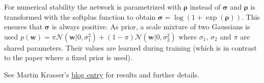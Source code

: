 \documentclass[%
oneside,                 %
final,                   %
10pt]{article}
\begin{document}
For numerical stability the network is parametrized with $\boldsymbol{\rho}$ instead of $\boldsymbol{\sigma}$ and $\boldsymbol{\rho}$ is transformed with the softplus function to obtain $\boldsymbol{\sigma} = \log(1 + \exp(\boldsymbol{\rho}))$. This ensures that $\boldsymbol{\sigma}$ is always positive. As prior, a scale mixture of two Gaussians is used $p(\boldsymbol{w}) = \pi \mathcal{N}(\boldsymbol{w} \lvert 0,\sigma_1^2) + (1 - \pi) \mathcal{N}(\boldsymbol{w} \lvert 0,\sigma_2^2)$ where $\sigma_1$, $\sigma_2$ and $\pi$ are shared parameters. Their values are learned during training (which is in contrast to the paper where a fixed prior is used).

See Martin Krasser's \href{{http://krasserm.github.io/2019/03/14/bayesian-neural-networks/}}{blog entry} for results and further details.


\end{document}
